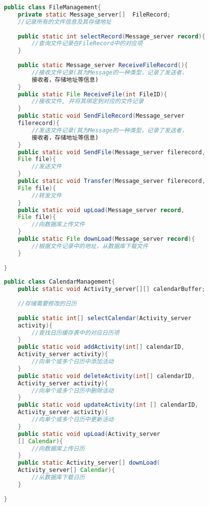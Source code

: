 \begin{lstlisting}[language=Java, caption=文件管理类]
public class FileManagement{
    private static Message_server[]  FileRecord; 
    //记录所有的文件信息及其存储地址
    
    public static int selectRecord(Message_server record){
        //查询文件记录在FileRecord中的对应项
    }
    
    public static Message_server ReceiveFileRecord(){
        //接收文件记录(其为Message的一种类型，记录了发送者，
        接收者，存储地址等信息)
    }
    public static File ReceiveFile(int FileID){
        //接收文件, 并将其绑定到对应的文件记录
    }
    public static void SendFileRecord(Message_server 
    filerecord){
        //发送文件记录(其为Message的一种类型，记录了发送者，
        接收者，存储地址等信息)
    }
    public static void SendFile(Message_server filerecord,
    File file){
        //发送文件
    }
    public static void Transfer(Message_server filerecord,
    File file){
        //转发文件
    }
    public static void upLoad(Message_server record, 
    File file){
        //向数据库上传文件
    }
    public static File downLoad(Message_server record){
        //根据文件记录中的地址，从数据库下载文件
    }
    
}
\end{lstlisting}

\begin{lstlisting}[language=Java, caption=日历管理类]
public class CalendarManagement{
    public static void Activity_server[][] calendarBuffer;
    
    //存储需要修改的日历
    
    public static int[] selectCalendar(Activity_server
    activity){
        //查找日历缓存表中的对应日历项
    }
    public static void addActivity(int[] calendarID, 
    Activity_server activity){
        //向单个或多个日历中添加活动
    }
    public static void deleteActivity(int[] calendarID, 
    Activity_server activity){
        //向单个或多个日历中删除活动
    }
    public static void updateActivity(int [] calendarID, 
    Activity_server activity){
        //向单个或多个日历中更新活动
    }
    public static void upLoad(Activity_server
    [] Calendar){
        //向数据库上传日历
    }
    public static Activity_server[] downLoad(
    Activity_server[] Calendar){
        //从数据库下载日历
    }
    
}
\end{lstlisting}

